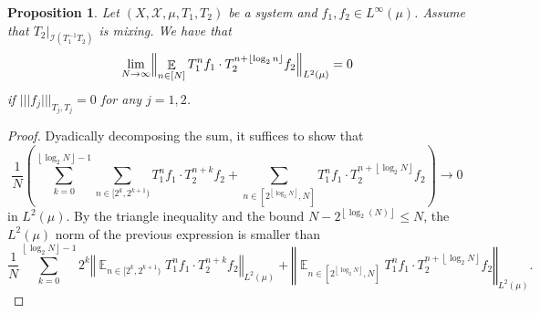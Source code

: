 \documentclass[11pt]{amsart}
\newtheorem{proposition}[lemma]{Proposition}
\theoremstyle{definition}
\DeclareMathOperator*{\E}{\mathbb{E}}
\newcommand{\CI}{{\mathcal I}}
\newcommand{\norm}[1]{\left\Vert #1\right\Vert}
\newcommand{\nnorm}[1]{\lvert\!|\!| #1|\!|\!\rvert}
\newcommand{\1}{{\mathbf{1}}}
\newcommand{\brac}[1]{\mathopen{}\left( #1 \mathclose{}\right)}
\newcommand{\floor}[1]{{\left \lfloor #1 \right \rfloor}}
\newcommand{\sfloor}[1]{{\lfloor #1 \rfloor}}
\begin{document}
\begin{proposition}\label{est12}
    Let $(X,\mathcal{X},\mu,T_{1},T_{2})$ be a system and $f_{1},f_{2}\in L^{\infty}(\mu)$. Assume that $T_{2}\vert_{\CI(T^{-1}_{1}T_{2})}$ is mixing. We have that 
    $$\lim_{N\to\infty}\Bigl\Vert\E_{n\in[N]} T_{1}^n f_1\cdot T_{2}^{n+\floor{\log_{2}n}}f_2\Bigr\Vert_{L^2(\mu)}=0$$
    if $\nnorm{f_{j}}_{T_{j},T_{j}}=0$ for any $j=1,2$.
\end{proposition}
\begin{proof}
        Dyadically decomposing the sum, it suffices to show that 
        \begin{equation*}
        \frac{1}{N}\brac{\sum_{k=0}^{\floor{\log_2 N}-1} \sum_{n\in[2^k,2^{k+1})}T_{1}^n f_1\cdot T_{2}^{n+k}f_2 + \sum_{n\in[2^\floor{\log_2 N}, N]}T_{1}^n f_1\cdot T_{2}^{n+\floor{\log_2 N}}f_2}\to 0
    \end{equation*}in $L^2(\mu)$.
By the triangle inequality and the bound $N-2^\floor{\log_2(N)}\leq N$, the $L^2(\mu)$ norm of the previous expression is smaller than \begin{equation*}
    \frac{1}{N}\sum_{k=0}^{\floor{\log_2 N}-1}2^k \norm{\E_{n\in[2^k,2^{k+1})} T_{1}^n f_1\cdot T_{2}^{n+k}f_2}_{L^2(\mu)} + \norm{\E_{n\in[2^\floor{\log_2 N}, N]}T_{1}^n f_1\cdot T_{2}^{n+\floor{\log_2 N}}f_2}_{L^2(\mu)}.
\end{equation*}

\end{proof}
\end{document}
